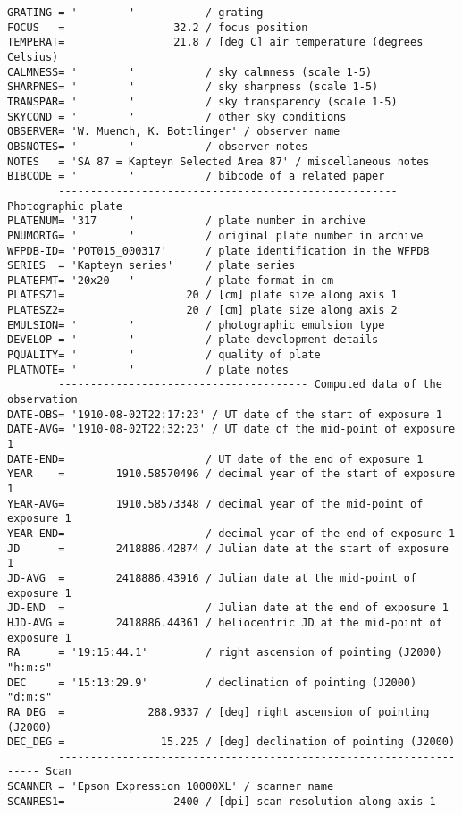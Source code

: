 \documentclass[11pt]{ivoa}
\begin{document}
\begin{lstlisting}
GRATING = '        '           / grating
FOCUS   =                 32.2 / focus position
TEMPERAT=                 21.8 / [deg C] air temperature (degrees Celsius)
CALMNESS= '        '           / sky calmness (scale 1-5)
SHARPNES= '        '           / sky sharpness (scale 1-5)
TRANSPAR= '        '           / sky transparency (scale 1-5)
SKYCOND = '        '           / other sky conditions
OBSERVER= 'W. Muench, K. Bottlinger' / observer name
OBSNOTES= '        '           / observer notes
NOTES   = 'SA 87 = Kapteyn Selected Area 87' / miscellaneous notes
BIBCODE = '        '           / bibcode of a related paper
        ----------------------------------------------------- Photographic plate
PLATENUM= '317     '           / plate number in archive
PNUMORIG= '        '           / original plate number in archive
WFPDB-ID= 'POT015_000317'      / plate identification in the WFPDB
SERIES  = 'Kapteyn series'     / plate series
PLATEFMT= '20x20   '           / plate format in cm
PLATESZ1=                   20 / [cm] plate size along axis 1
PLATESZ2=                   20 / [cm] plate size along axis 2
EMULSION= '        '           / photographic emulsion type
DEVELOP = '        '           / plate development details
PQUALITY= '        '           / quality of plate
PLATNOTE= '        '           / plate notes
        --------------------------------------- Computed data of the observation
DATE-OBS= '1910-08-02T22:17:23' / UT date of the start of exposure 1
DATE-AVG= '1910-08-02T22:32:23' / UT date of the mid-point of exposure 1
DATE-END=                      / UT date of the end of exposure 1
YEAR    =        1910.58570496 / decimal year of the start of exposure 1
YEAR-AVG=        1910.58573348 / decimal year of the mid-point of exposure 1
YEAR-END=                      / decimal year of the end of exposure 1
JD      =        2418886.42874 / Julian date at the start of exposure 1
JD-AVG  =        2418886.43916 / Julian date at the mid-point of exposure 1
JD-END  =                      / Julian date at the end of exposure 1
HJD-AVG =        2418886.44361 / heliocentric JD at the mid-point of exposure 1
RA      = '19:15:44.1'         / right ascension of pointing (J2000) "h:m:s"
DEC     = '15:13:29.9'         / declination of pointing (J2000) "d:m:s"
RA_DEG  =             288.9337 / [deg] right ascension of pointing (J2000)
DEC_DEG =               15.225 / [deg] declination of pointing (J2000)
        ------------------------------------------------------------------- Scan
SCANNER = 'Epson Expression 10000XL' / scanner name
SCANRES1=                 2400 / [dpi] scan resolution along axis 1

\end{lstlisting}
\end{document}
